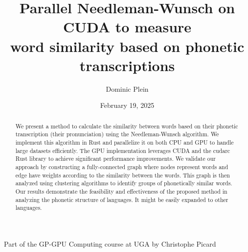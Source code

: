 \documentclass[10pt,a4paper,english]{article}
\title{\vspace{-0.0em}Parallel Needleman-Wunsch on CUDA to measure\\
word similarity based on phonetic transcriptions}
\author{Dominic Plein}
\date{February 19, 2025}
\newcommand{\abstractText}{\noindent
	\newline\noindent
    We present a method to calculate the similarity between words based on their phonetic transcription (their pronunciation) using the Needleman-Wunsch algorithm. We implement this algorithm in Rust and parallelize it on both CPU and GPU to handle large datasets efficiently. The GPU implementation leverages CUDA and the cudarc Rust library to achieve significant performance improvements. We validate our approach by constructing a fully-connected graph where nodes represent words and edge have weights according to the similarity between the words. This graph is then analyzed using clustering algorithms to identify groups of phonetically similar words. Our results demonstrate the feasibility and effectiveness of the proposed method in analyzing the phonetic structure of languages. It might be easily expanded to other languages.
}
\begin{document}
\setlength{\abovedisplayskip}{0.2em}

\maketitle
\begin{center}
    \small{Part of the GP-GPU Computing course at UGA by Christophe Picard}
\end{center}

\vspace{1em}
\begin{abstract}
    \abstractText
    \newline
    \newline
\end{abstract}



\begin{multicols*}{2}
\tableofcontents

\newcolumn


\vfill\null
\columnbreak



\end{multicols*}

\renewcommand*{\glsgroupskip}{} %
\printglossary[type=\acronymtype]

\printbibliography[
    heading=bibintoc,
    title={Bibliography},
    keyword={lit}
]
\printbibliography[
    title={Data sources \& Tools},
    keyword={data}
]
\end{document}
